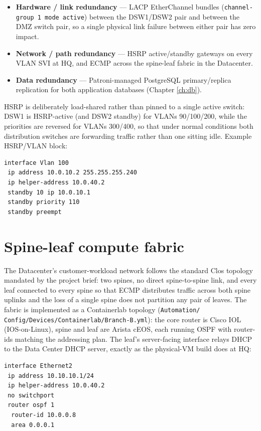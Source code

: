 \documentclass[11pt,a4paper]{report}
\begin{document}
\begin{itemize}[leftmargin=1.5em]
  \item \textbf{Hardware / link redundancy} --- LACP EtherChannel bundles
    (\texttt{channel-group 1 mode active}) between the DSW1/DSW2 pair and
    between the DMZ switch pair, so a single physical link failure between
    either pair has zero impact.
  \item \textbf{Network / path redundancy} --- HSRP active/standby gateways
    on every VLAN SVI at HQ, and ECMP across the spine-leaf fabric in the
    Datacenter.
  \item \textbf{Data redundancy} --- Patroni-managed PostgreSQL
    primary/replica replication for both application databases
    (Chapter \ref{ch:db}).
\end{itemize}

HSRP is deliberately load-shared rather than pinned to a single active
switch: DSW1 is HSRP-active (and DSW2 standby) for VLANs 90/100/200, while
the priorities are reversed for VLANs 300/400, so that under normal
conditions both distribution switches are forwarding traffic rather than
one sitting idle. Example HSRP/VLAN block:

\begin{lstlisting}
interface Vlan 100
 ip address 10.0.10.2 255.255.255.240
 ip helper-address 10.0.40.2
 standby 10 ip 10.0.10.1
 standby priority 110
 standby preempt
\end{lstlisting}

\section{Spine-leaf compute fabric}

The Datacenter's customer-workload network follows the standard Clos
topology mandated by the project brief: two spines, no direct
spine-to-spine link, and every leaf connected to every spine so that ECMP
distributes traffic across both spine uplinks and the loss of a single
spine does not partition any pair of leaves. The fabric is implemented as a
Containerlab topology (\texttt{Automation/} \textrightarrow{}
\texttt{Config/Devices/Containerlab/Branch-B.yml}): the core router is
Cisco IOL (IOS-on-Linux), spine and leaf are Arista cEOS, each running OSPF
with router-ids matching the addressing plan. The leaf's server-facing
interface relays DHCP to the Data Center DHCP server, exactly as the
physical-VM build does at HQ:

\begin{lstlisting}
interface Ethernet2
 ip address 10.10.10.1/24
 ip helper-address 10.0.40.2
 no switchport
 router ospf 1
  router-id 10.0.0.8
  area 0.0.0.1
\end{lstlisting}
\end{document}
